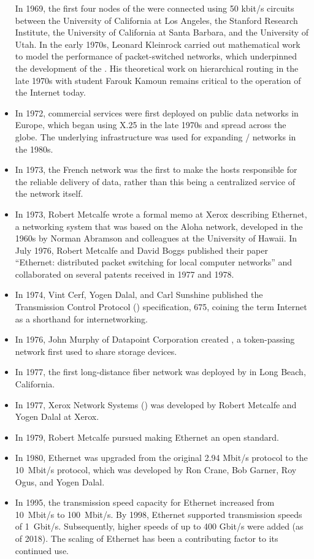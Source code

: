 \begin{itemize}
   In 1969, the first four nodes of the  were connected using 50 kbit/s circuits between the University of California at Los Angeles, the Stanford Research Institute, the University of California at Santa Barbara, and the University of Utah.
   In the early 1970s, Leonard Kleinrock carried out mathematical work to model the performance of packet-switched networks, which underpinned the development of the .
   His theoretical work on hierarchical routing in the late 1970s with student Farouk Kamoun remains critical to the operation of the Internet today.
\item
   In 1972, commercial services were first deployed on public data networks in Europe, which began using X.25 in the late 1970s and spread across the globe.
   The underlying infrastructure was used for expanding / networks in the 1980s.
\item
   In 1973, the French  network was the first to make the hosts responsible for the reliable delivery of data, rather than this being a centralized service of the network itself.
\item
   In 1973, Robert Metcalfe wrote a formal memo at Xerox  describing Ethernet, a networking system that was based on the Aloha network, developed in the 1960s by Norman Abramson and colleagues at the University of Hawaii.
   In July 1976, Robert Metcalfe and David Boggs published their paper ``Ethernet: distributed packet switching for local computer networks'' and collaborated on several patents received in 1977 and 1978.
\item
   In 1974, Vint Cerf, Yogen Dalal, and Carl Sunshine published the Transmission Control Protocol () specification,  675, coining the term Internet as a shorthand for internetworking.
\item
   In 1976, John Murphy of Datapoint Corporation created , a token-passing network first used to share storage devices.
\item
   In 1977, the first long-distance fiber network was deployed by  in Long Beach, California.
\item
   In 1977, Xerox Network Systems () was developed by Robert Metcalfe and Yogen Dalal at Xerox.
\item
   In 1979, Robert Metcalfe pursued making Ethernet an open standard.
\item
   In 1980, Ethernet was upgraded from the original 2.94 Mbit/s protocol to the 10~Mbit/s protocol, which was developed by Ron Crane, Bob Garner, Roy Ogus, and Yogen Dalal.
\item
   In 1995, the transmission speed capacity for Ethernet increased from 10~Mbit/s to 100~Mbit/s.
   By 1998, Ethernet supported transmission speeds of 1~Gbit/s.
   Subsequently, higher speeds of up to 400 Gbit/s were added (as of 2018).
   The scaling of Ethernet has been a contributing factor to its continued use.
\end{itemize}



